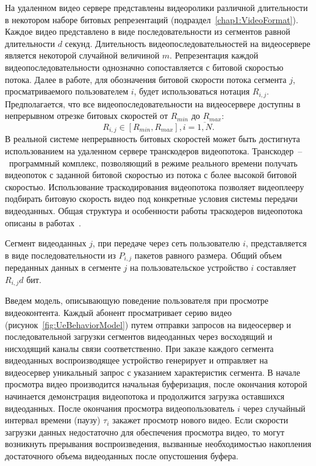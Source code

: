 На удаленном видео сервере представлены видеоролики различной длительности в некотором наборе битовых репрезентаций (подраздел~\ref{chap1:VideoFormat}). Каждое видео представлено в виде последовательности из сегментов равной длительности $d$ секунд. Длительность видеопоследовательностей на видеосервере является некоторой случайной величиной $m$. Репрезентация каждой видеопоследовательности однозначно сопоставляется с битовой скоростью потока. Далее в работе, для обозначения битовой скорости потока сегмента $j$, просматриваемого пользователем $i$, будет использоваться нотация $R_{i,j}$. Предполагается, что все видеопоследовательности на видеосервере доступны в непрерывном отрезке битовых скоростей от $R_{min}$ до $R_{max}$:
\begin{equation}
R_{i,j} \in [R_{min}, R_{max}], i=\overline{1,N}.
\label{eq:BitrateConstr}
\end{equation}
В реальной системе непрерывность битовых скоростей может быть достигнута использованием на удаленном сервере транскодеров видеопотока. Транскодер~--~программный комплекс, позволяющий в режиме реального времени получать видеопоток с заданной битовой скоростью из потока с более высокой битовой скоростью. Использование траскодирования видеопотока позволяет видеоплееру подбирать битовую скорость видео под конкретные условия системы передачи видеоданных. Общая структура и особенности работы траскодеров видеопотока описаны в работах~\cite{1184336,1369700}.

Сегмент видеоданных $j$, при передаче через сеть пользователю $i$, представляется в виде последовательности из $P_{i,j}$ пакетов равного размера. Общий объем переданных данных в сегменте $j$ на пользовательское устройство $i$ составляет $R_{i,j} d$ бит.

Введем модель, описывающую поведение пользователя при просмотре видеоконтента. Каждый абонент просматривает серию видео (рисунок~\ref{fig:UeBehaviorModel}) путем отправки запросов на видеосервер и последовательной загрузки сегментов видеоданных через восходящий и нисходящий каналы связи соответственно. При заказе каждого сегмента видеоданных воспроизводящее устройство генерирует и отправляет на видеосервер уникальный запрос с указанием характеристик сегмента. В начале просмотра видео производится начальная буферизация, после окончания которой начинается демонстрация видеопотока и продолжится загрузка оставшихся видеоданных. После окончания просмотра видеопользователь $i$ через случайный интервал времени (паузу) $\tau_i$ закажет просмотр нового видео. Если скорости загрузки данных недостаточно для обеспечения просмотра видео, то могут возникнуть прерывания воспроизведения, вызванные необходимостью накопления достаточного объема видеоданных после опустошения буфера.

